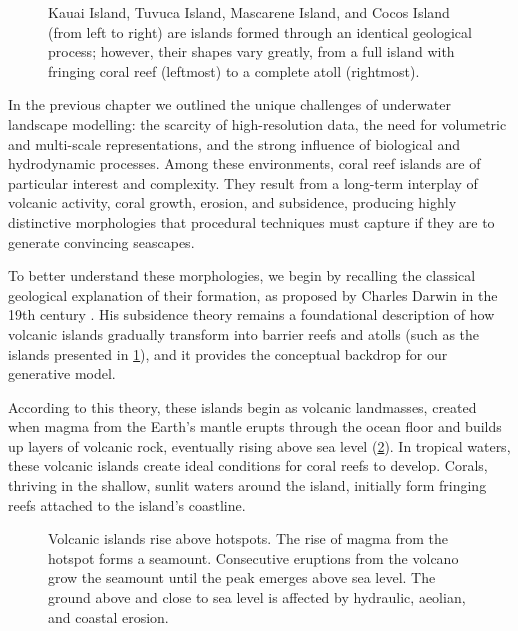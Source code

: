 \begin{figure}[H]
\caption{Kauai Island, Tuvuca Island, Mascarene Island, and Cocos Island (from left to right) are islands formed through an identical geological process; however, their shapes vary greatly, from a full island with fringing coral reef (leftmost) to a complete atoll (rightmost).}
\label{fig:coral-island-island-examples}
\end{figure}

In the previous chapter we outlined the unique challenges of underwater landscape modelling: the scarcity of high-resolution data, the need for volumetric and multi-scale representations, and the strong influence of biological and hydrodynamic processes. Among these environments, coral reef islands are of particular interest and complexity. They result from a long-term interplay of volcanic activity, coral growth, erosion, and subsidence, producing highly distinctive morphologies that procedural techniques must capture if they are to generate convincing seascapes.

To better understand these morphologies, we begin by recalling the classical geological explanation of their formation, as proposed by Charles Darwin in the 19th century \cite{Darwin1842}. His subsidence theory remains a foundational description of how volcanic islands gradually transform into barrier reefs and atolls (such as the islands presented in \cref{fig:coral-island-island-examples}), and it provides the conceptual backdrop for our generative model.

According to this theory, these islands begin as volcanic landmasses, created when magma from the Earth's mantle erupts through the ocean floor and builds up layers of volcanic rock, eventually rising above sea level (\cref{fig:coral-island-island-growth}). In tropical waters, these volcanic islands create ideal conditions for coral reefs to develop. Corals, thriving in the shallow, sunlit waters around the island, initially form fringing reefs attached to the island's coastline.

\begin{figure}[H]
    \caption{Volcanic islands rise above hotspots. The rise of magma from the hotspot forms a seamount. Consecutive eruptions from the volcano grow the seamount until the peak emerges above sea level. The ground above and close to sea level is affected by hydraulic, aeolian, and coastal erosion.}
    \label{fig:coral-island-island-growth}
\end{figure}

